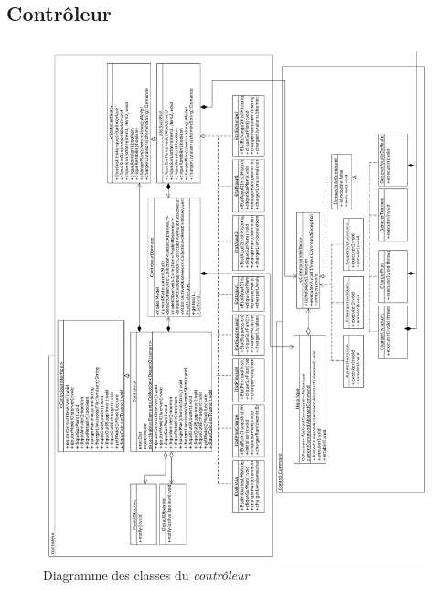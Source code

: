 \documentclass[10pt,a4paper]{book}
\begin{document}
\subsection{Contrôleur}
\begin{figure}[h!]
    \includegraphics[scale=0.38]{controleur.png}
    \caption{Diagramme des classes du \textit{contrôleur}}
\end{figure}
\newpage
\end{document}

